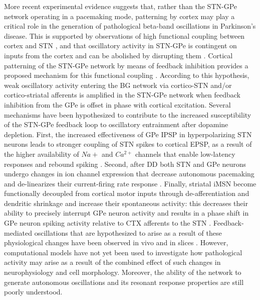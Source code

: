 %
%
%
More recent experimental evidence suggests that, rather than the STN-GPe network operating
in a pacemaking mode, patterning by cortex may play a critical role in the generation of pathological
beta-band oscillations in Parkinson's disease. This is supported by observations of high functional
coupling between cortex and STN \cite{mallet_parkinsonian_2008,magill_brain_2004,moran_alterations_2011,sharott_dopamine_2005,litvak_resting_2011,stein_beta_2013},
and that oscillatory activity in STN-GPe is contingent on inputs from the cortex
and can be abolished by disrupting them \cite{drouot_functional_2004,magill_dopamine_2001,tachibana_subthalamo-pallidal_2011}.
Cortical patterning of the STN-GPe network by means of feedback inhibition provides a proposed
mechanism for this functional coupling
\cite{baufreton_enhancement_2005,bevan_cellular_2006,tachibana_subthalamo-pallidal_2011,mallet_parkinsonian_2008,mallet_dichotomous_2012}.
According to this hypothesis, weak oscillatory activity entering the BG network
via cortico-STN and/or cortico-striatal afferents is amplified in the STN-GPe network when
feedback inhibition from the GPe is offset in phase with cortical excitation. Several mechanisms
have been hypothesized to contribute to the increased susceptibility of the STN-GPe feedback
loop to oscillatory entrainment after dopamine depletion. First, the increased effectiveness
of GPe IPSP in hyperpolarizing STN neurons leads to stronger coupling of STN spikes to
cortical EPSP, as a result of the higher availability of $Na+$ and $Ca^{2+}$ channels
that enable low-latency responses and rebound spiking \cite{baufreton_enhancement_2005,hallworth_globus_2005,hallworth_apamin-sensitive_2003,otsuka_excitatory_2001}.
Second, after DD both STN and GPe neurons undergo changes in ion channel expression
that decrease autonomous pacemaking and de-linearizes their current-firing rate response \cite{loucif_depolarisation_2008,zhu_pharmacological_2002,mciver_chemogenetic_2018,mciver_maladaptive_2019,chan_hcn_2011}.
%
Finally, striatal iMSN become functionally decoupled from cortical motor inputs through de-afferentiation and dendritic shrinkage and increase their spontaneous activity:
this decreases their ability to precisely interrupt GPe neuron activity and results
in a phase shift in GPe neuron spiking activity relative to CTX afferents to the STN \cite{day_selective_2006,baufreton_enhancement_2005,mallet_cortical_2006,mallet_parkinsonian_2008,mallet_dichotomous_2012}.
Feedback-mediated oscillations that are hypothesized to arise as a result
of these physiological changes have been observed in vivo \cite{paz_rhythmic_2005} and
in slices \cite{baufreton_enhancement_2005}. However, computational models have
not yet been used to investigate how pathological activity may arise as a result
of the combined effect of such changes in neurophysiology and cell morphology.
Moreover, the ability of the network to generate autonomous oscillations and its
resonant response properties are still poorly understood.

